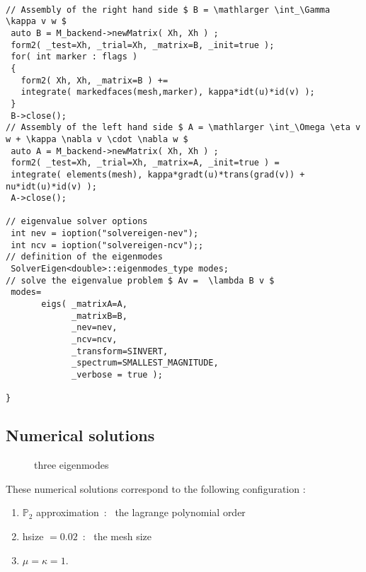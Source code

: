 \begin{lstlisting}

// Assembly of the right hand side $ B = \mathlarger \int_\Gamma \kappa v w $
 auto B = M_backend->newMatrix( Xh, Xh ) ;
 form2( _test=Xh, _trial=Xh, _matrix=B, _init=true );
 for( int marker : flags )
 {
   form2( Xh, Xh, _matrix=B ) +=
   integrate( markedfaces(mesh,marker), kappa*idt(u)*id(v) );
 }
 B->close();
// Assembly of the left hand side $ A = \mathlarger \int_\Omega \eta v w + \kappa \nabla v \cdot \nabla w $
 auto A = M_backend->newMatrix( Xh, Xh ) ;
 form2( _test=Xh, _trial=Xh, _matrix=A, _init=true ) =
 integrate( elements(mesh), kappa*gradt(u)*trans(grad(v)) + nu*idt(u)*id(v) );
 A->close();

// eigenvalue solver options
 int nev = ioption("solvereigen-nev");
 int ncv = ioption("solvereigen-ncv");;
// definition of the eigenmodes
 SolverEigen<double>::eigenmodes_type modes;
// solve the eigenvalue problem $ Av =  \lambda B v $
 modes=
       eigs( _matrixA=A,
             _matrixB=B,
             _nev=nev,
             _ncv=ncv,
             _transform=SINVERT,
             _spectrum=SMALLEST_MAGNITUDE,
             _verbose = true );

}

\end{lstlisting}

\subsection{Numerical solutions}
\label{sec:numerical-solutions-1}
\vspace{-17pt}
\begin{figure}[htbp]
  \centering
  \hspace{0.3cm}
  \hspace{0.3cm}
  \caption{three eigenmodes}
\label{fig:eigenvalues}
\end{figure}
These numerical solutions correspond to the following configuration :
\begin{enumerate}
\item $\mathbb P_2$ approximation~:~ the lagrange polynomial order
\item hsize $= 0.02$~:~ the mesh size
\item $\mu = \kappa = 1.$
\end{enumerate}
